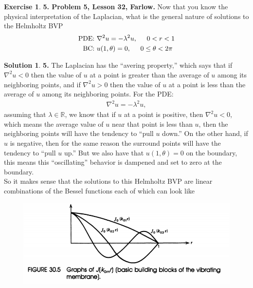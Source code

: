 \documentclass{article}
\theoremstyle{definition}
\newtheorem*{exer*}{Exercise}
\newtheorem*{sln*}{Solution}
\newcommand{\R}{\mathbb{R}}
\begin{document}
\newpage

\begin{exer*}\textbf{5. Problem 5, Lesson 32, Farlow.} Now that you know the physical interpretation of the Laplacian, what is the general nature of solutions to the Helmholtz BVP
	\begin{align*}
	\text{PDE: } & \laplacian u = -\lambda^2u, \hspace{0.5cm} 0 < r< 1\\
	\text{BC: } & u(1,\theta) = 0, \hspace{0.5cm}  0 \leq \theta < 2\pi
	\end{align*} 
	
	\begin{sln*}\textbf{5.} 
		The Laplacian has the ``avering property,'' which says that if $\nabla^2 u < 0$ then the value of $u$ at a point is greater than the average of $u$ among its neighboring points, and if $\nabla^2 u > 0$ then the value of $u$ at a point is less than the average of $u$ among its neighboring points. For the PDE:
		\begin{align*}
		\nabla^2 u = -\lambda^2 u,
		\end{align*}
		assuming that $\lambda \in \R$, we know that if $u$ at a point is positive, then $\nabla^2 u < 0$, which means the average value of $u$ near that point is less than $u$, then the neighboring points will have the tendency to ``pull $u$ down.'' On the other hand, if $u$ is negative, then for the same reason the surround points will have the tendency to ``pull $u$ up.'' But we also have that $u(1,\theta) = 0$ on the boundary, this means this ``oscillating'' behavior is dampened and set to zero at the boundary.\\
		
		So it makes sense that the solutions to this Helmholtz BVP are linear combinations of the Bessel functions each of which can look like
		\begin{figure}[h!]
			\centering
			\includegraphics[scale=0.75]{helmholtz.png}
		\end{figure} 
	\end{sln*}
\end{exer*}
\end{document}
